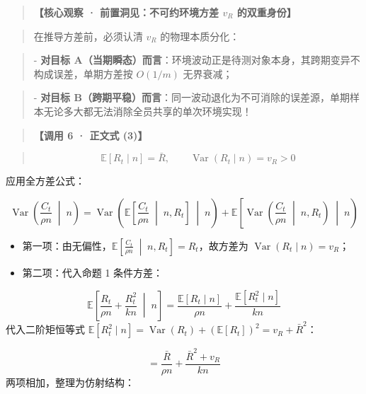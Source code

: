 \documentclass[11pt,a4paper]{ctexart}
\begin{document}
\begin{quote}\small\color{black!75}
\textbf{【核心观察 · 前置洞见：不可约环境方差 $v_R$ 的双重身份】}
\end{quote}
\begin{quote}\small\color{black!75}
在推导方差前，必须认清 $v_R$ 的物理本质分化：
\end{quote}
\begin{quote}\small\color{black!75}
- \textbf{对目标 A（当期瞬态）而言}：环境波动正是待测对象本身，其跨期变异不构成误差，单期方差按 $O(1/m)$ 无界衰减；
\end{quote}
\begin{quote}\small\color{black!75}
- \textbf{对目标 B（跨期平稳）而言}：同一波动退化为不可消除的误差源，单期样本无论多大都无法消除全员共享的单次环境实现！
\end{quote}

\begin{quote}\small\color{black!75}
\textbf{【调用 6 · 正文式 (3)】}
\end{quote}
\begin{quote}\small\color{black!75}
\begin{equation*}
\mathbb{E}[R_t \mid n] = \bar{R}, \qquad \operatorname{Var}(R_t \mid n) = v_R > 0 \tag{eq:env\_conditional\_moment}
\end{equation*}
\end{quote}

应用全方差公式：

\[
\operatorname{Var}\left(\frac{C_t}{\rho n} \;\middle|\; n\right) = \operatorname{Var}\left( \mathbb{E}\left[\frac{C_t}{\rho n} \;\middle|\; n, R_t\right] \;\middle|\; n \right) + \mathbb{E}\left[ \operatorname{Var}\left(\frac{C_t}{\rho n} \;\middle|\; n, R_t\right) \;\middle|\; n \right)
\]
\begin{itemize}[leftmargin=2em, itemsep=2pt, parsep=0pt]
\item 第一项：由无偏性，$\mathbb{E}\left[\frac{C_t}{\rho n} \;\middle|\; n, R_t\right] = R_t$，故方差为 $\operatorname{Var}(R_t \mid n) = v_R$；
\item 第二项：代入命题 1 条件方差：
\end{itemize}
\[
\mathbb{E}\left[ \frac{R_t}{\rho n} + \frac{R_t^2}{kn} \;\middle|\; n \right] = \frac{\mathbb{E}[R_t \mid n]}{\rho n} + \frac{\mathbb{E}[R_t^2 \mid n]}{kn}
\]
代入二阶矩恒等式 $\mathbb{E}[R_t^2 \mid n] = \operatorname{Var}(R_t) + (\mathbb{E}[R_t])^2 = v_R + \bar{R}^2$：

\[
= \frac{\bar{R}}{\rho n} + \frac{\bar{R}^2 + v_R}{kn}
\]
两项相加，整理为仿射结构：
\end{document}
